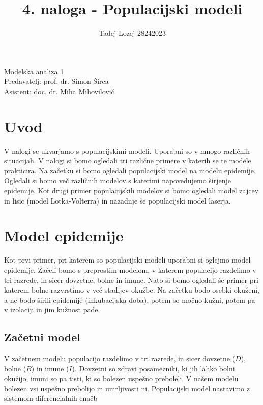 \documentclass[slovene,11pt,a4paper]{article}
\begin{document}
\title{4. naloga - Populacijski modeli}
\author{Tadej Lozej 28242023}
\maketitle
\begin{center}
Modelska analiza 1 \\
\bigskip
Predavatelj: prof. dr. Simon Širca \\
Asistent: doc. dr. Miha Mihovilovič
\end{center}

\newpage

\tableofcontents

\newpage

\section{Uvod}


V nalogi se ukvarjamo s populacijskimi modeli. Uporabni so v mnogo različnih situacijah. V nalogi si bomo ogledali tri različne primere v katerih se te modele prakticira. Na začetku si bomo ogledali populacijski model na modelu epidemije. Ogledali si bomo več različnih modelov s katerimi napovedujemo širjenje epidemije. Kot drugi primer populacijskih modelov si bomo ogledali model zajcev in lisic (model Lotka-Volterra) in nazadnje še populacijski model laserja.

\section{Model epidemije}

Kot prvi primer, pri katerem so populacijski modeli uporabni si oglejmo model epidemije. Začeli bomo s preprostim modelom, v katerem populacijo razdelimo v tri razrede, in sicer dovzetne, bolne in imune. Nato si bomo ogledali še primer pri katerem bolne razvrstimo v več stadijev okužbe. Na začetku bodo osebki okuženi, a ne bodo širili epidemije (inkubacijska doba), potem so močno kužni, potem pa v izolaciji in jim kužnost pade.

\subsection{Začetni model}

V začetnem modelu populacijo razdelimo v tri razrede, in sicer dovzetne ($D$), bolne ($B$) in imune ($I$). Dovzetni so zdravi posamezniki, ki jih lahko bolni okužijo, imuni so pa tisti, ki so bolezen uspešno preboleli. V našem modelu bolezen vsi uspešno prebolijo in umrljivosti ni. Populacijski model nastavimo z sistemom diferencialnih enačb
\end{document}
